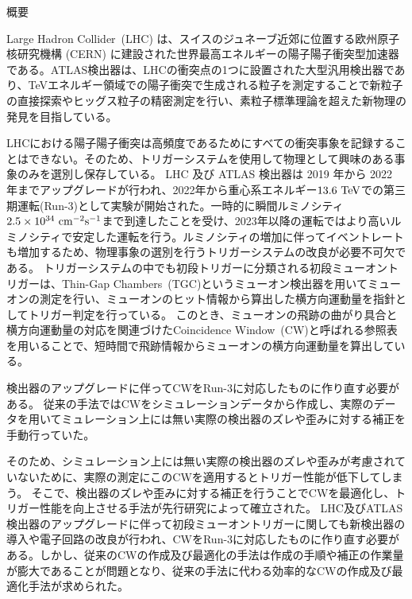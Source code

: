 \begin{center}
  \begin{huge}
    概要
  \end{huge}
\end{center}

\vspace{10pt}

Large Hadron Collider~(LHC) は、スイスのジュネーブ近郊に位置する欧州原子核研究機構 (CERN) に建設された世界最高エネルギーの陽子陽子衝突型加速器である。ATLAS検出器は、LHCの衝突点の1つに設置された大型汎用検出器であり、TeVエネルギー領域での陽子衝突で生成される粒子を測定することで新粒子の直接探索やヒッグス粒子の精密測定を行い、素粒子標準理論を超えた新物理の発見を目指している。

LHCにおける陽子陽子衝突は高頻度であるためにすべての衝突事象を記録することはできない。そのため、トリガーシステムを使用して物理として興味のある事象のみを選別し保存している。
LHC 及び ATLAS 検出器は 2019 年から 2022 年までアップグレードが行われ、2022年から重心系エネルギー$13.6~{\rm TeV}$での第三期運転(Run-3)として実験が開始された。一時的に瞬間ルミノシティ$2.5\times10^{34}~{\rm cm^{-2}s^{-1}}$まで到達したことを受け、2023年以降の運転ではより高いルミノシティで安定した運転を行う。ルミノシティの増加に伴ってイベントレートも増加するため、物理事象の選別を行うトリガーシステムの改良が必要不可欠である。
トリガーシステムの中でも初段トリガーに分類される初段ミューオントリガーは、Thin-Gap Chambers~(TGC)というミューオン検出器を用いてミューオンの測定を行い、ミューオンのヒット情報から算出した横方向運動量を指針としてトリガー判定を行っている。
このとき、ミューオンの飛跡の曲がり具合と横方向運動量の対応を関連づけたCoincidence Window~(CW)と呼ばれる参照表を用いることで、短時間で飛跡情報からミューオンの横方向運動量を算出している。

検出器のアップグレードに伴ってCWをRun-3に対応したものに作り直す必要がある。
従来の手法ではCWをシミュレーションデータから作成し、実際のデータを用いてミュレーション上には無い実際の検出器のズレや歪みに対する補正を手動行っていた。

そのため、シミュレーション上には無い実際の検出器のズレや歪みが考慮されていないために、実際の測定にこのCWを適用するとトリガー性能が低下してしまう。
そこで、検出器のズレや歪みに対する補正を行うことでCWを最適化し、トリガー性能を向上させる手法が先行研究によって確立された。
LHC及びATLAS検出器のアップグレードに伴って初段ミューオントリガーに関しても新検出器の導入や電子回路の改良が行われ、CWをRun-3に対応したものに作り直す必要がある。しかし、従来のCWの作成及び最適化の手法は作成の手順や補正の作業量が膨大であることが問題となり、従来の手法に代わる効率的なCWの作成及び最適化手法が求められた。

